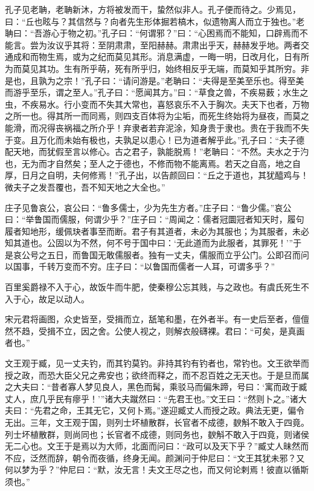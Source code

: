 \documentclass[]{article}
\begin{document}
孔子见老聃，老聃新沐，方将被发而干，蛰然似非人。孔子便而待之。少焉见，曰：``丘也眩与？其信然与？向者先生形体掘若槁木，似遗物离人而立于独也。''老聃曰：``吾游心于物之初。''孔子曰：``何谓邪？''曰：``心困焉而不能知，口辟焉而不能言。尝为汝议乎其将：至阴肃肃，至阳赫赫。肃肃出乎天，赫赫发乎地。两者交通成和而物生焉，或为之纪而莫见其形。消息满虚，一晦一明，日改月化，日有所为而莫见其功。生有所乎萌，死有所乎归，始终相反乎无端，而莫知乎其所穷。非是也，且孰为之宗！''孔子曰：``请问游是。''老聃曰：``夫得是至美至乐也。得至美而游乎至乐，谓之至人。''孔子曰：``愿闻其方。''曰：``草食之兽，不疾易薮；水生之虫，不疾易水。行小变而不失其大常也，喜怒哀乐不入于胸次。夫天下也者，万物之所一也。得其所一而同焉，则四支百体将为尘垢，而死生终始将为昼夜，而莫之能滑，而况得丧祸福之所介乎！弃隶者若弃泥涂，知身贵于隶也。贵在于我而不失于变。且万化而未始有极也，夫孰足以患心！已为道者解乎此。''孔子曰：``夫子德配天地，而犹假至言以修心。古之君子，孰能脱焉！''老聃曰：``不然。夫水之于汋也，无为而才自然矣；至人之于德也，不修而物不能离焉。若天之自高，地之自厚，日月之自明，夫何修焉！''孔子出，以告颜回曰：``丘之于道也，其犹醯鸡与！微夫子之发吾覆也，吾不知天地之大全也。''

庄子见鲁哀公，哀公曰：``鲁多儒士，少为先生方者。''庄子曰：``鲁少儒。''哀公曰：``举鲁国而儒服，何谓少乎？''庄子曰：``周闻之：儒者冠圜冠者知天时，履句履者知地形，缓佩玦者事至而断。君子有其道者，未必为其服也；为其服者，未必知其道也。公固以为不然，何不号于国中曰：`无此道而为此服者，其罪死！'''于是哀公号之五日，而鲁国无敢儒服者。独有一丈夫，儒服而立乎公门。公即召而问以国事，千转万变而不穷。庄子曰：``以鲁国而儒者一人耳，可谓多乎？''

百里奚爵禄不入于心，故饭牛而牛肥，使秦穆公忘其贱，与之政也。有虞氏死生不入于心，故足以动人。

宋元君将画图，众史皆至，受揖而立，舐笔和墨，在外者半。有一史后至者，儃儃然不趋，受揖不立，因之舍。公使人视之，则解衣般礴裸。君曰：``可矣，是真画者也。''

文王观于臧，见一丈夫钓，而其钓莫钓。非持其钓有钓者也，常钓也。文王欲举而授之政，而恐大臣父兄之弗安也；欲终而释之，而不忍百姓之无天也。于是旦而属之大夫曰：``昔者寡人梦见良人，黑色而髯，乘驳马而偏朱蹄，号曰：`寓而政于臧丈人，庶几乎民有瘳乎！'''诸大夫蹴然曰∶``先君王也。''文王曰：``然则卜之。''诸大夫曰∶``先君之命，王其无它，又何卜焉。''遂迎臧丈人而授之政。典法无更，偏令无出。三年，文王观于国，则列士坏植散群，长官者不成德，斔斛不敢入于四竟。列士坏植散群，则尚同也；长官者不成德，则同务也，斔斛不敢入于四竟，则诸侯无二心也。文王于是焉以为大师，北面而问曰：``政可以及天下乎？''臧丈人昧然而不应，泛然而辞，朝令而夜循，终身无闻。颜渊问于仲尼曰：``文王其犹未邪？又何以梦为乎？''仲尼曰：``默，汝无言！夫文王尽之也，而又何论剌焉！彼直以循斯须也。''
\end{document}
